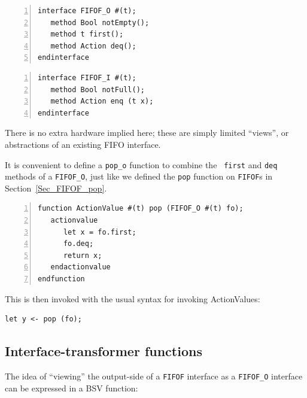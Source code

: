 {\small
\begin{Verbatim}[frame=single, numbers=left]
interface FIFOF_O #(t);
   method Bool notEmpty();
   method t first();
   method Action deq();
endinterface
\end{Verbatim}
}


{\small
\begin{Verbatim}[frame=single, numbers=left]
interface FIFOF_I #(t);
   method Bool notFull();
   method Action enq (t x);
endinterface
\end{Verbatim}
}

There is no extra hardware implied here; these are simply limited
``views'', or abstractions of an existing FIFO interface.


It is convenient to define a \verb|pop_o| function to combine the {\tt
first} and {\tt deq} methods of a {\tt FIFOF\_O}, just like we defined
the {\tt pop} function on {\tt FIFOF}s in Section~\ref{Sec_FIFOF_pop}.

{\small
\begin{Verbatim}[frame=single, numbers=left]
function ActionValue #(t) pop (FIFOF_O #(t) fo);
   actionvalue
      let x = fo.first;
      fo.deq;
      return x;
   endactionvalue
endfunction
\end{Verbatim}
}

This is then invoked with the usual syntax for invoking ActionValues:

{\small
\begin{Verbatim}[frame=single]
   let y <- pop (fo);
\end{Verbatim}
}



\subsection{Interface-transformer functions}

\label{Sec_interface_transfomers}


The idea of ``viewing'' the output-side of a \verb|FIFOF| interface as
a \verb|FIFOF_O| interface can be expressed in a BSV function:


